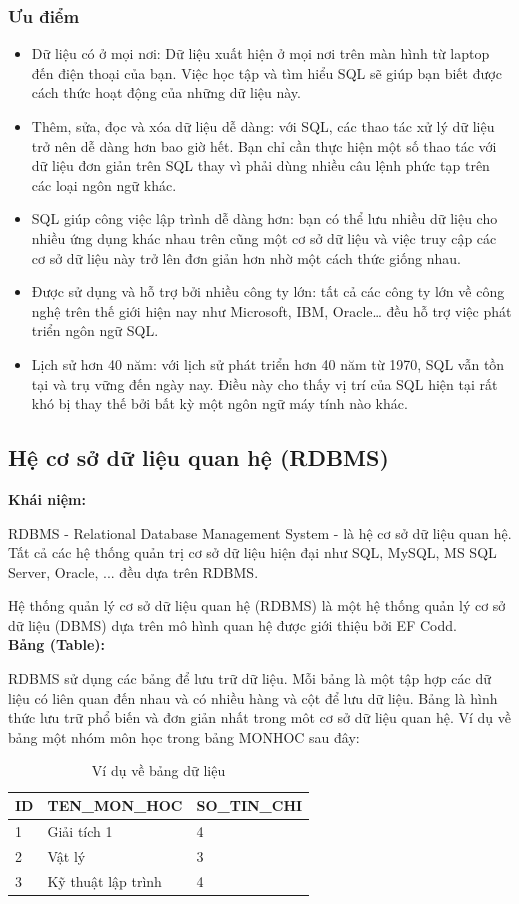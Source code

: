 \subsubsection{Ưu điểm}
\begin{itemize}
    \item Dữ liệu có ở mọi nơi: Dữ liệu xuất hiện ở mọi nơi trên màn hình từ laptop đến điện thoại của bạn. Việc học tập và tìm hiểu SQL sẽ giúp bạn biết được cách thức hoạt động của những dữ liệu này.
    \item Thêm, sửa, đọc và xóa dữ liệu dễ dàng: với SQL, các thao tác xử lý dữ liệu trở nên dễ dàng hơn bao giờ hết. Bạn chỉ cần thực hiện một số thao tác với dữ liệu đơn giản trên SQL thay vì phải dùng nhiều câu lệnh phức tạp trên các loại ngôn ngữ khác.
    \item SQL giúp công việc lập trình dễ dàng hơn: bạn có thể lưu nhiều dữ liệu cho nhiều ứng dụng khác nhau trên cũng một cơ sở dữ liệu và việc truy cập các cơ sở dữ liệu này trở lên đơn giản hơn nhờ một cách thức giống nhau.
    \item Được sử dụng và hỗ trợ bởi nhiều công ty lớn: tất cả các công ty lớn về công nghệ trên thế giới hiện nay như Microsoft, IBM, Oracle… đều hỗ trợ việc phát triển ngôn ngữ SQL.
    \item Lịch sử hơn 40 năm: với lịch sử phát triển hơn 40 năm từ 1970, SQL vẫn tồn tại và trụ vững đến ngày nay. Điều này cho thấy vị trí của SQL hiện tại rất khó bị thay thế bởi bất kỳ một ngôn ngữ máy tính nào khác.
\end{itemize}
\subsection{Hệ cơ sở dữ liệu quan hệ (RDBMS)}
\textbf{Khái niệm:}

RDBMS - Relational Database Management System - là hệ cơ sở dữ liệu quan hệ. Tất cả các hệ thống quản trị cơ sở dữ liệu hiện đại như SQL, MySQL, MS SQL Server, Oracle, ... đều dựa trên RDBMS.

Hệ thống quản lý cơ sở dữ liệu quan hệ (RDBMS) là một hệ thống quản lý cơ sở dữ liệu (DBMS) dựa trên mô hình quan hệ được giới thiệu bởi EF Codd.\\

\textbf{Bảng (Table):}

RDBMS sử dụng các bảng để lưu trữ dữ liệu. Mỗi bảng là một tập hợp các dữ liệu có liên quan đến nhau và có nhiều hàng và cột để lưu dữ liệu. Bảng là hình thức lưu trữ phổ biến và đơn giản nhất trong môt cơ sở dữ liệu quan hệ. Ví dụ về bảng một nhóm môn học trong bảng MONHOC sau đây:\\
\begin{table}[H]
    \centering
    \begin{tabular}{|l|l|l|}
    \hline
         \textbf{ID}&\textbf{TEN\_MON\_HOC}&\textbf{SO\_TIN\_CHI}\\
         \hline
         1&Giải tích 1&4\\
		\hline
		2&Vật lý&3\\
		\hline			
		3&Kỹ thuật lập trình&4\\
		\hline
    \end{tabular}
    \caption{Ví dụ về bảng dữ liệu}
\end{table}


